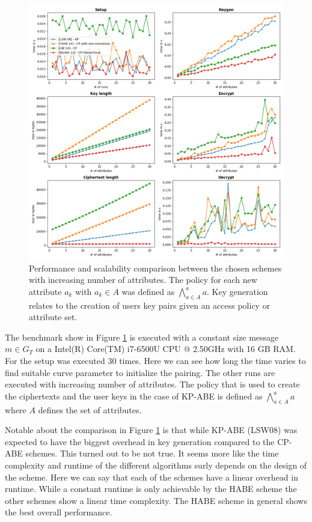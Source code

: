 \begin{figure}[!ht]
\centering
    \includegraphics[width=1\linewidth]{img/basic_abe_comparisons.png}
    \caption{Performance and scalability comparison between the chosen schemes with increasing number of attributes. The policy for each new attribute $a_k$ with $a_k \in A$ was defined as $\bigwedge\limits_{a \in A}^a a$. Key generation relates to the creation of users key pairs given an access policy or attribute set.}
    \label{fig:basic_abe_comparison}
\end{figure}

The  benchmark show in Figure \ref{fig:basic_abe_comparison} is executed with a constant size message $m \in G_T$ on a Intel(R) Core(TM) i7-6500U CPU @ 2.50GHz with 16 GB RAM. For the setup was executed 30 times. Here we can see how long the time varies to find suitable curve parameter to initialize the pairing. The other runs are executed with increasing number of attributes. The policy that is used to create the ciphertexts and the user keys in the case of KP-ABE is defined as $\bigwedge\limits_{a \in A}^a a$ where $A$ defines the set of attributes. 

Notable about the comparison in Figure \ref{fig:basic_abe_comparison} is that while \ac{KP-ABE} (LSW08) was expected to have the biggest overhead in key generation compared to the \ac{CP-ABE} schemes. This turned out to be not true. It seems more like the time complexity and runtime of the different algorithms surly depends on the design of the scheme. Here we can say that each of the schemes have a linear overhead in runtime. While a constant runtime is only achievable by the HABE scheme the other schemes show a linear time complexity. The HABE scheme in general shows the best overall performance. 

